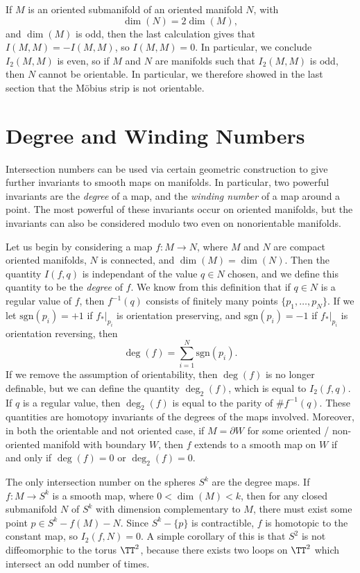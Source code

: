 If $M$ is an oriented submanifold of an oriented manifold $N$, with
%
\[ \dim(N) = 2 \dim(M), \]
%
and $\dim(M)$ is odd, then the last calculation gives that $I(M,M) = - I(M,M)$, so $I(M,M) = 0$. In particular, we conclude $I_2(M,M)$ is even, so if $M$ and $N$ are manifolds such that $I_2(M,M)$ is odd, then $N$ cannot be orientable. In particular, we therefore showed in the last section that the M\"{o}bius strip is not orientable.

\section{Degree and Winding Numbers}

Intersection numbers can be used via certain geometric construction to give further invariants to smooth maps on manifolds. In particular, two powerful invariants are the \emph{degree} of a map, and the \emph{winding number} of a map around a point. The most powerful of these invariants occur on oriented manifolds, but the invariants can also be considered modulo two even on nonorientable manifolds.

Let us begin by considering a map $f: M \to N$, where $M$ and $N$ are compact oriented manifolds, $N$ is connected, and $\dim(M) = \dim(N)$. Then the quantity $I(f,q)$ is independant of the value $q \in N$ chosen, and we define this quantity to be the \emph{degree} of $f$. We know from this definition that if $q \in N$ is a regular value of $f$, then $f^{-1}(q)$ consists of finitely many points $\{ p_1, \dots, p_N \}$. If we let $\text{sgn}(p_i) = +1$ if $f_*|_{p_i}$ is orientation preserving, and $\text{sgn}(p_i) = -1$ if $f_*|_{p_i}$ is orientation reversing, then
%
\[ \deg(f) = \sum_{i = 1}^N \text{sgn}(p_i). \]
%
If we remove the assumption of orientability, then $\deg(f)$ is no longer definable, but we can define the quantity $\deg_2(f)$, which is equal to $I_2(f,q)$. If $q$ is a regular value, then $\deg_2(f)$ is equal to the parity of $\# f^{-1}(q)$. These quantities are homotopy invariants of the degrees of the maps involved. Moreover, in both the orientable and not oriented case, if $M = \partial W$ for some oriented / non-oriented manifold with boundary $W$, then $f$ extends to a smooth map on $W$ if and only if $\deg(f) = 0$ or $\deg_2(f) = 0$.

\begin{example}
    The only intersection number on the spheres $S^k$ are the degree maps. If $f: M \to S^k$ is a smooth map, where $0 < \dim(M) < k$, then for any closed submanifold $N$ of $S^k$ with dimension complementary to $M$, there must exist some point $p \in S^k - f(M) - N$. Since $S^k - \{ p \}$ is contractible, $f$ is homotopic to the constant map, so $I_2(f,N) = 0$. A simple corollary of this is that $S^2$ is not diffeomorphic to the torus $\TT^2$, because there exists two loops on $\TT^2$ which intersect an odd number of times.
\end{example}

